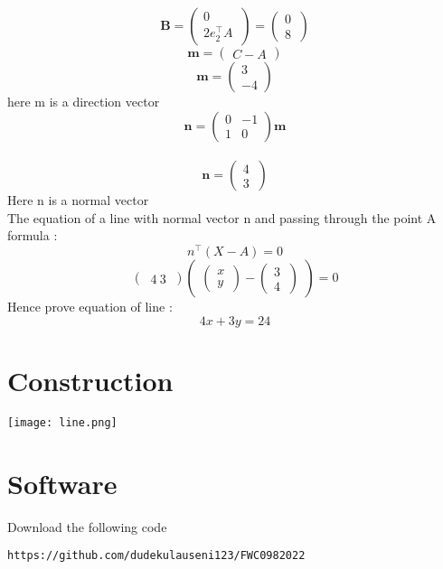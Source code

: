 \documentclass[10pt, a4paper]{article}
\newcommand{\myvec}[1]{\ensuremath{\begin{pmatrix}#1\end{pmatrix}}}
\begin{document}
$$\textbf{B}=\begin{pmatrix} 0\\2e_2^{\top}A\ \end{pmatrix}=\begin{pmatrix} 0\\ 8\ \end{pmatrix}$$
$$\textbf{m}=\begin{pmatrix}C-A\end{pmatrix}$$
$$\textbf{m}=\begin{pmatrix} 3\\-4 \end{pmatrix}$$
here m is a direction vector\\
$$\textbf{n}=\myvec{0&-1 \\ 1&0}\textbf{m}$$\\
$$\textbf{n}=\begin{pmatrix} 4\\ 3\ \end{pmatrix}$$
Here n is a normal vector \\


The equation of a line with normal vector n and passing through the point A  formula :\\
$$n^{\top}(X-A)=0$$
$$\begin{pmatrix} \ 4 \   3\ \end{pmatrix}\begin{pmatrix}
\begin{pmatrix} x\\ y\ \end{pmatrix} - \begin{pmatrix} 3\\ 4\ \end{pmatrix}\end{pmatrix}=0$$
Hence prove equation of line :$$4x+3y=24$$ 
\unboldmath
\section{Construction}
 \texttt{[image: line.png]}
\section{Software}
 Download the following code
 \begin{lstlisting}
https://github.com/dudekulauseni123/FWC0982022
 \end{lstlisting}
\end{document}
